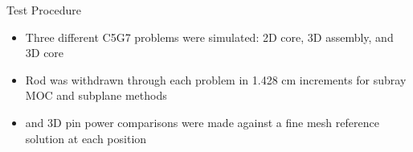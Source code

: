 
\begin{frame}[t]{Test Procedure}
    
    \begin{itemize}
        \item Three different C5G7 problems were simulated: 2D core, 3D assembly, and 3D core
        \item Rod was withdrawn through each problem in 1.428 cm increments for subray MOC and subplane methods
        \item \keff{} and 3D pin power comparisons were made against a fine mesh reference solution at each position
    \end{itemize}
    
\end{frame}


